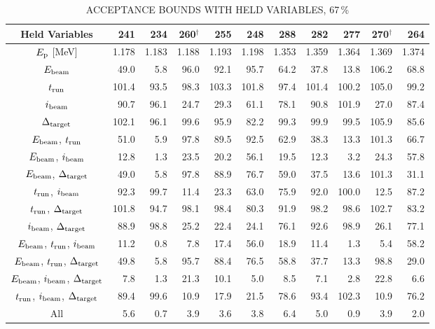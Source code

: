 \begin{landscape}
\begin{table}
    \begin{center}
        \caption{ACCEPTANCE BOUNDS WITH HELD VARIABLES, 67\,\%}
        \label{tab:acceptance-uncertainty-67}
        \begin{tabular}{crrrrrrrrrr}
            \toprule
            \midrule
            \textbf{Held Variables}
                & \textbf{241} & \textbf{234} & \textbf{260}$^\dagger$ & \textbf{255} & \textbf{248}
                & \textbf{288} & \textbf{282} & \textbf{277} & \textbf{270}$^\dagger$ & \textbf{264} \\
            \midrule
$E_{\rm p}$ [MeV] & 1.178 & 1.183 & 1.188 & 1.193 & 1.198 & 1.353 & 1.359 & 1.364 & 1.369 & 1.374 \\
\midrule
$E_{\rm beam}$ &  49.0 &   5.8 &  96.0 &  92.1 &  95.7 &  64.2 &  37.8 &
    13.8 & 106.2 &  68.8 \\
$t_{\rm run}$ & 101.4 &  93.5 &  98.3 & 103.3 & 101.8 &  97.4 & 101.4 &
    100.2 & 105.0 &  99.2 \\
$i_{\rm beam}$ &  90.7 &  96.1 &  24.7 &  29.3 &  61.1 &  78.1 &  90.8 &
    101.9 &  27.0 &  87.4 \\
$\Delta_{\rm target}$ & 102.1 &  96.1 &  99.6 &  95.9 &  82.2 &  99.3 &
    99.9 &  99.5 & 105.9 &  85.6 \\
$E_{\rm beam}$, $t_{\rm run}$ &  51.0 &   5.9 &  97.8 &  89.5 &  92.5 &
    62.9 &  38.3 &  13.3 & 101.3 &  66.7 \\
$E_{\rm beam}$, $i_{\rm beam}$ &  12.8 &   1.3 &  23.5 &  20.2 &  56.1 &
    19.5 &  12.3 &   3.2 &  24.3 &  57.8 \\
$E_{\rm beam}$, $\Delta_{\rm target}$ &  49.0 &   5.8 &  97.8 &  88.9 &
    76.7 &  59.0 &  37.5 &  13.6 & 101.3 &  31.1 \\
$t_{\rm run}$, $i_{\rm beam}$ &  92.3 &  99.7 &  11.4 &  23.3 &  63.0 &
    75.9 &  92.0 & 100.0 &  12.5 &  87.2 \\
$t_{\rm run}$, $\Delta_{\rm target}$ & 101.8 &  94.7 &  98.1 &  98.4 &
    80.3 &  91.9 &  98.2 &  98.6 & 102.7 &  83.2 \\
$i_{\rm beam}$, $\Delta_{\rm target}$ &  88.9 &  98.8 &  25.2 &  22.4 &
    24.1 &  76.1 &  92.6 &  98.9 &  26.1 &  77.1 \\
$E_{\rm beam}$, $t_{\rm run}$, $i_{\rm beam}$ &  11.2 &   0.8 &   7.8 &
    17.4 &  56.0 &  18.9 &  11.4 &   1.3 &   5.4 &  58.2 \\
$E_{\rm beam}$, $t_{\rm run}$, $\Delta_{\rm target}$ &  49.8 &   5.8 &
    95.7 &  88.4 &  76.5 &  58.8 &  37.7 &  13.3 &  98.8 &  29.0 \\
$E_{\rm beam}$, $i_{\rm beam}$, $\Delta_{\rm target}$ &   7.8 &   1.3 &
    21.3 &  10.1 &   5.0 &   8.5 &   7.1 &   2.8 &  22.8 &   6.6 \\
$t_{\rm run}$, $i_{\rm beam}$, $\Delta_{\rm target}$ &  89.4 &  99.6 &
    10.9 &  17.9 &  21.5 &  78.6 &  93.4 & 102.3 &  10.9 &  76.2 \\
All &   5.6 &   0.7 &   3.9 &   3.6 &   3.8 &   6.4 &   5.0 &   0.9 &
    3.9 &   2.0 \\
            \bottomrule
        \end{tabular}


\end{center}
\end{table}
\end{landscape}
